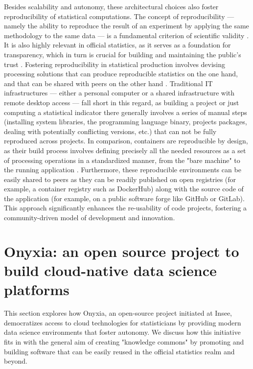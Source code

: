 \documentclass[graybox]{svmult}
\begin{document}
Besides scalability and autonomy, these architectural choices also foster reproducibility of statistical computations. The concept of reproducibility — namely the ability to reproduce the result of an experiment by applying the same methodology to the same data — is a fundamental criterion of scientific validity \cite{mcnutt2014reproducibility}. It is also highly relevant in official statistics, as it serves as a foundation for transparency, which in turn is crucial for building and maintaining the public's trust \cite{eurocodepractice2018}. Fostering reproducibility in statistical production involves devising processing solutions that can produce reproducible statistics on the one hand, and that can be shared with peers on the other hand \cite{ntts2019reproducibility}. Traditional IT infrastructures — either a personal computer or a shared infrastructure with remote desktop access — fall short in this regard, as building a project or just computing a statistical indicator there generally involves a series of manual steps (installing system libraries, the programming language binary, projects packages, dealing with potentially conflicting versions, etc.) that can not be fully reproduced across projects. In comparison, containers are reproducible by design, as their build process involves defining precisely all the needed resources as a set of processing operations in a standardized manner, from the "bare machine" to the running application \cite{moreau2023containers}. Furthermore, these reproducible environments can be easily shared to peers as they can be readily published on open registries (for example, a container registry such as DockerHub) along with the source code of the application (for example, on a public software forge like GitHub or GitLab). This approach significantly enhances the re-usability of code projects, fostering a community-driven model of development and innovation.




\section{Onyxia: an open source project to build cloud-native data science platforms}
\label{sec:implementation}

This section explores how Onyxia, an open-source project initiated at Insee, democratizes access to cloud technologies for statisticians by providing modern data science environments that foster autonomy. We discuss how this initiative fits in with the general aim of creating "knowledge commons" by promoting and building software that can be easily reused in the official statistics realm and beyond.
\end{document}
